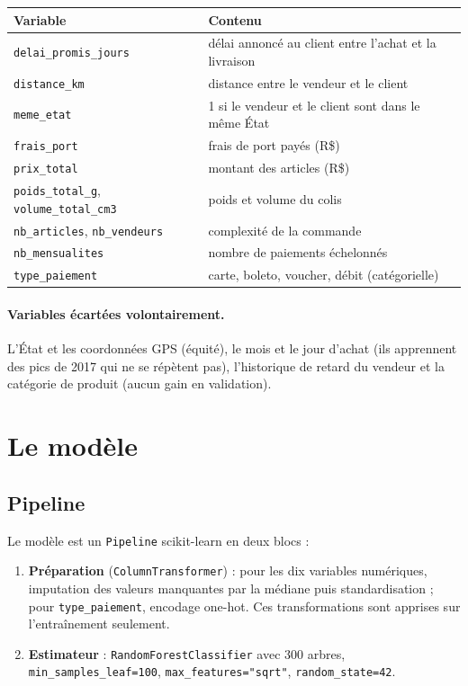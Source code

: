 \documentclass[11pt,a4paper]{article}
\newcommand{\var}[1]{\texttt{#1}}
\begin{document}
\begin{center}
\begin{tabularx}{\linewidth}{@{}l X@{}}
\toprule
Variable & Contenu \\
\midrule
\var{delai\_promis\_jours} & délai annoncé au client entre l'achat et la livraison \\
\var{distance\_km} & distance entre le vendeur et le client \\
\var{meme\_etat} & 1 si le vendeur et le client sont dans le même État \\
\var{frais\_port} & frais de port payés (R\$) \\
\var{prix\_total} & montant des articles (R\$) \\
\var{poids\_total\_g}, \var{volume\_total\_cm3} & poids et volume du colis \\
\var{nb\_articles}, \var{nb\_vendeurs} & complexité de la commande \\
\var{nb\_mensualites} & nombre de paiements échelonnés \\
\var{type\_paiement} & carte, boleto, voucher, débit (catégorielle) \\
\bottomrule
\end{tabularx}
\end{center}

\paragraph{Variables écartées volontairement.} L'État et les coordonnées GPS (équité), le mois
et le jour d'achat (ils apprennent des pics de 2017 qui ne se répètent pas), l'historique de
retard du vendeur et la catégorie de produit (aucun gain en validation).

\section{Le modèle}

\subsection{Pipeline}

Le modèle est un \var{Pipeline} scikit-learn en deux blocs :
\begin{enumerate}
  \item \textbf{Préparation} (\var{ColumnTransformer}) : pour les dix variables numériques,
        imputation des valeurs manquantes par la médiane puis standardisation ; pour
        \var{type\_paiement}, encodage one-hot. Ces transformations sont apprises sur
        l'entraînement seulement.
  \item \textbf{Estimateur} : \var{RandomForestClassifier} avec 300 arbres,
        \var{min\_samples\_leaf=100}, \var{max\_features="sqrt"}, \var{random\_state=42}.
\end{enumerate}
\end{document}
